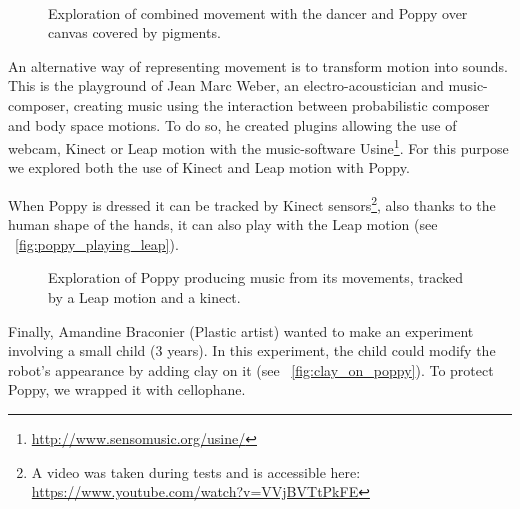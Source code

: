\begin{figure}[tb]
\centering
    \hfill
    \\
    \hfill
    \caption{Exploration of combined movement with the dancer and Poppy over canvas covered by pigments.}
    \label{fig:residency_canvas}
\end{figure}

An alternative way of representing movement is to transform motion into sounds. This is the playground of Jean Marc Weber, an electro-acoustician and music-composer, creating music using the interaction between probabilistic composer and body space motions. To do so, he created plugins allowing the use of webcam, Kinect or Leap motion with the music-software Usine\footnote{\url{http://www.sensomusic.org/usine/}}. For this purpose we explored both the use of Kinect and Leap motion with Poppy.

When Poppy is dressed it can be tracked by Kinect sensors\footnote{A video was taken during tests and is accessible here: \url{https://www.youtube.com/watch?v=VVjBVTtPkFE}}, also thanks to the human shape of the hands, it can also play with the Leap motion (see \figurename~\ref{fig:poppy_playing_leap}).

\begin{figure}[tb]
\centering
    \hfil
    \caption{Exploration of Poppy producing music from its movements, tracked by a Leap motion and a kinect.}

\end{figure}

Finally, Amandine Braconier (Plastic artist) wanted to make an experiment involving a small child (3 years). In this experiment, the child could modify the robot’s appearance by adding clay on it (see \figurename~\ref{fig:clay_on_poppy}). To protect Poppy, we wrapped it with cellophane.


